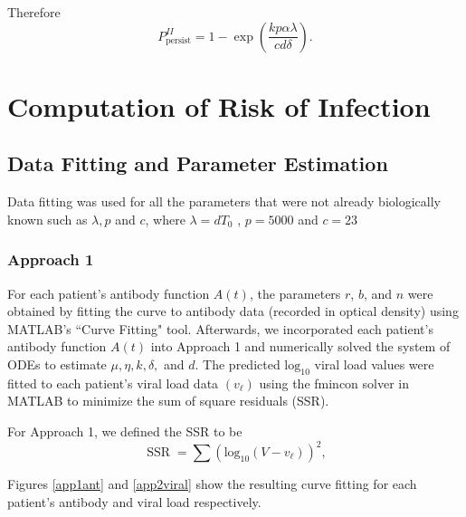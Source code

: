 \documentclass[]{elsarticle}
\newcommand{\SSR}{\operatorname{SSR}}
\theoremstyle{definition}
\begin{document}
Therefore
\begin{equation}
    P_\text{persist}^{II} = 1 - \exp\left(\frac{kp\alpha\lambda}{cd\delta}\right).
    \label{ppersist2}
\end{equation}










\section{Computation of Risk of Infection}

\subsection{Data Fitting and Parameter Estimation}

Data fitting was used for all the parameters that were not already biologically known such as $\lambda, p$ and $c$, where $\lambda = dT_0$ \cite{stafford2000modeling}, $p = 5000$ \cite{vaidya2018correlation} and $c = 23$ \cite{wei2003antibody}

\subsubsection{Approach 1}
For each patient's antibody function $A(t)$, the parameters $r$, $b$, and $n$ were obtained by fitting the curve to antibody data (recorded in optical density) using MATLAB's ``Curve Fitting" tool. Afterwards, we incorporated each patient's antibody function $A(t)$ into Approach 1 and numerically solved the system of ODEs to estimate $\mu, \eta,k, \delta, $ and $d$. The predicted $\text{log}_{10}$ viral load values were fitted to each patient's viral load data $(v_\ell)$ using the fmincon solver in MATLAB to minimize the sum of square residuals (SSR).

For Approach 1, we defined the SSR to be
$$\SSR = \sum (\text{log}_{10}(V-v_{\ell}))^2,$$

Figures \ref{app1ant} and \ref{app2viral} show the resulting curve fitting for each patient's antibody and viral load respectively.
\end{document}
